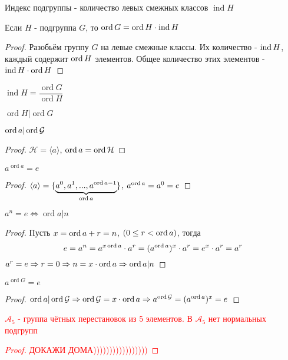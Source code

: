 \documentclass[../main/document.tex]{subfiles}
\begin{document}
\begin{dfn}
Индекс подгруппы - количество левых смежных классов $\operatorname{ind}H$
\end{dfn}

\begin{thm}
Если $H$ - подгруппа $G$, то $\operatorname{ord}G=\operatorname{ord}H\cdot \operatorname{ind} H$
\begin{proof}
Разобьём группу $G$ на левые смежные классы. Их количество - $\operatorname{ind} H$, каждый содержит $\operatorname{ord} H$ элементов. Общее количество этих элементов - $\operatorname{ind} H\cdot \operatorname{ord} H$

\end{proof}
\end{thm}
\begin{cnsq}
$\operatorname{ind}H=\dfrac{\operatorname{ord}G}{\operatorname{ord}H}$
\end{cnsq}

\begin{cnsq}
$\operatorname{ord}H|\operatorname{ord}G$
\end{cnsq}

\begin{cnsq}
$\operatorname{ord} a| \operatorname{ord} \mathcal{G}$
\begin{proof}
$\mathcal{H}=\langle a\rangle$, $\operatorname{ord} a= \operatorname{ord} \mathcal{H}$

\end{proof}
\end{cnsq}

\begin{thm}
$a^{\operatorname{ord}a}=e$
\begin{proof}
$\langle a\rangle=\{\underbrace{a^0,a^1,...,a^{\operatorname{ord} a-1}}_{\operatorname{ord} a}\}$, $a^{\operatorname{ord} a}=a^0=e$

\end{proof}
\end{thm}


\begin{thm}
$a^{n}=e\Leftrightarrow \operatorname{ord}a|n$
\begin{proof}
Пусть $x=\operatorname{ord} a +r=n$, $(0\leq r< \operatorname{ord} a)$, тогда
$$e=a^n=a^{x\operatorname{ord} a}\cdot a^r=(a^{\operatorname{ord} a})^x\cdot a^r=e^x\cdot a^r=a^r$$
$a^r=e\Rightarrow r=0 \Rightarrow n=x\cdot \operatorname{ord} a\Rightarrow \operatorname{ord} a|n$

\end{proof}
\end{thm}

\begin{thm}\label{power-order-of-group}
$a^{\operatorname{ord}G}=e$
\begin{proof}
$\operatorname{ord} a| \operatorname{ord} \mathcal{G}\Rightarrow \operatorname{ord} \mathcal{G}=x\cdot\operatorname{ord} a\Rightarrow a^{\operatorname{ord} \mathcal{G}}=(a^{\operatorname{ord} a})^x=e$

\end{proof}
\end{thm}
\textcolor{red}{
\begin{exm}
$\mathcal{A}_5$ - группа чётных перестановок из 5 элементов. В $\mathcal{A}_5$ нет нормальных подгрупп
\begin{proof}
ДОКАЖИ ДОМА)))))))))))))))))
\end{proof}
\end{exm}}
\end{document}
